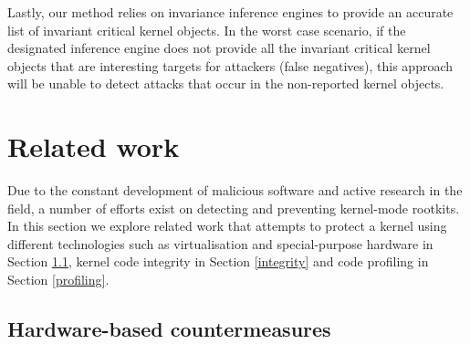 Lastly, our method relies on invariance inference engines to provide an accurate list of invariant critical kernel objects. In the worst case scenario, if the designated inference engine does not provide all the invariant critical kernel objects that are interesting targets for attackers (false negatives), this approach will be unable to detect attacks that occur in the non-reported kernel objects.



\section{Related work}\label{hr:related}
Due to the constant development of malicious software and active research in the field, a number of efforts exist on detecting and preventing kernel-mode rootkits. 
In this section we explore related work that attempts to protect a kernel using different technologies such as virtualisation and special-purpose hardware in Section \ref{hardware}, kernel code integrity in Section \ref{integrity} and code profiling in Section \ref{profiling}.


\subsection{Hardware-based countermeasures} \label{hardware}
